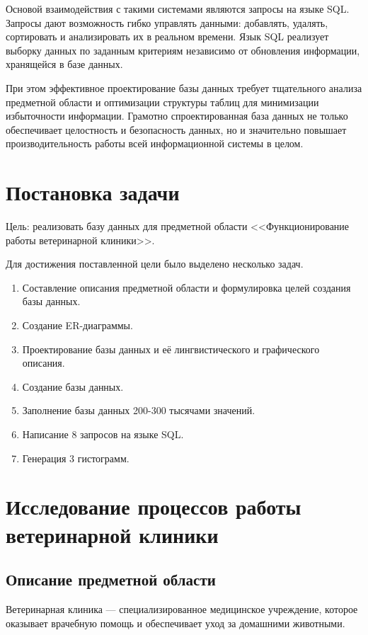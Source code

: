 \documentclass[a4paper]{article}
\begin{document}
Основой взаимодействия с такими системами являются запросы на языке SQL. Запросы дают возможность гибко управлять данными: добавлять, удалять, сортировать и анализировать их в реальном времени. Язык SQL реализует выборку данных по заданным критериям независимо от обновления информации, хранящейся в базе данных.

При этом эффективное проектирование базы данных требует тщательного анализа предметной области и оптимизации структуры таблиц для минимизации избыточности информации. Грамотно спроектированная база данных не только обеспечивает целостность и безопасность данных, но и значительно повышает производительность работы всей информационной системы в целом.

\newpage
\section{Постановка задачи}
Цель: реализовать базу данных для предметной области <<Функционирование работы ветеринарной клиники>>.

Для достижения поставленной цели было выделено несколько задач.

\begin{enumerate}
    \item Составление описания предметной области и формулировка целей создания базы данных.
    \item Создание ER-диаграммы.
    \item Проектирование базы данных и её лингвистического и графического описания.
    \item Создание базы данных.
    \item Заполнение базы данных 200-300 тысячами значений.
    \item Написание 8 запросов на языке SQL.
    \item Генерация 3 гистограмм.
\end{enumerate}

\newpage
\section{Исследование процессов работы ветеринарной клиники}
\subsection{Описание предметной области}
Ветеринарная клиника — специализированное медицинское учреждение, которое оказывает врачебную помощь и обеспечивает уход за домашними животными.
\end{document}
